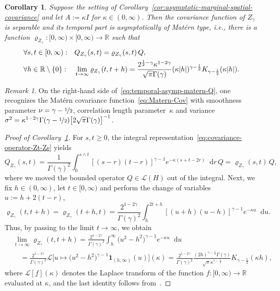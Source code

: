 \documentclass[reqno]{amsart}
\numberwithin{equation}{section}
\newcommand{\bbR}{\mathbb{R}}
\newcommand{\R}{\mathbb{R}}
\newcommand{\cL}{\mathcal{L}}
\newcommand{\rd}{\mathop{}\!\mathrm{d}}
\newcommand{\from}{\colon}
\newtheorem{corollary}[lemma]{Corollary}
\theoremstyle{remark}
\newtheorem{remark}[lemma]{Remark}
\theoremstyle{definition}
\begin{document}
\begin{corollary}\label{cor:separable-cov}
	Suppose the setting of 
	Corollary~\textup{\ref{cor:asymptotic-marginal-spatial-covariance}} and 
	let $A := \kappa I$ for ${\kappa \in (0,\infty)}$. 
	Then the covariance function of $Z_\gamma$ is 
	separable and its temporal part 
	is asymptotically of Matérn type, 
	i.e., there is a function 
	$\varrho_{Z_\gamma}\colon [0,\infty)\times[0,\infty) \to \R$ 
	such that  
	\begin{align}
	&\forall s,t \in [0,\infty):
	&&
	Q_{Z_\gamma}(s,t) 
	=
	\varrho_{Z_\gamma}(s,t)\, Q , 
	\notag
	\\ 
	&\forall h \in \bbR\setminus\{0\}: 
	&&
	\lim_{t\to\infty}\varrho_{Z_\gamma}(t,t+h)
	= 
	\frac{2^{\frac{1}{2}-\gamma}\kappa^{1-2\gamma}}
	{\sqrt{\pi}\Gamma(\gamma)}
	(\kappa |h|)^{\gamma-\frac{1}{2}} 
	K_{\gamma-\frac{1}{2}}(\kappa |h|) . 
	\label{eq:temporal-asymp-matern-Q}  
	\end{align}
\end{corollary}

\begin{remark}
	On the right-hand side 
	of~\eqref{eq:temporal-asymp-matern-Q}, one recognizes the
	Mat\'ern covariance function~\eqref{eq:Matern-Cov} 
	with smoothness parameter $\nu = \gamma-\nicefrac{1}{2}$,
	correlation length parameter~$\kappa$ and variance
	$\sigma^2 
	= 
	\kappa^{1-2\gamma} \Gamma(\gamma-\nicefrac{1}{2}) 
	\bigl[ 2 \sqrt{\pi} \Gamma(\gamma) \bigr]^{-1}$\!. 
\end{remark} 

\begin{proof}[Proof of Corollary~\ref{cor:separable-cov}] 
	For $s,t \geq 0$,
	the integral representation~\eqref{eq:covariance-operator-Zt-Zs} 
	yields 
	\[ 
	Q_{Z_\gamma}(s,t) 
	= 
	\frac{1}{\Gamma(\gamma)^2}
	\int_0^{s\wedge t}
	[(s-r)(t-r)]^{\gamma-1} e^{-\kappa(s+t-2r)}
	\rd r
	\, Q 
	= \varrho_{Z_\gamma}(s,t) \, Q,
	\] 
	where we moved the bounded operator $Q\in \mathscr L(H)$ 
	out of the integral.	
	Next, we fix $h \in (0,\infty)$, let $t \in [0,\infty)$ 
	and perform the change of 
	variables ${u :=h + 2(t-r) }$, 
	\[ 
	\varrho_{Z_\gamma}(t,t+h)   
	=
	\varrho_{Z_\gamma}(t+h,t)  
	= 
	\frac{2^{1-2\gamma}}{\Gamma(\gamma)^2}
	\int_h^{2t+h}
	[(u+h)(u-h)]^{\gamma-1} e^{-\kappa u}
	\rd u. 
	\] 
	Thus, by passing to the limit $t \to \infty$, 
	we obtain  
	\begin{align*}
	&\lim_{t\to\infty} \varrho_{Z_\gamma}(t,t+h)
	= 
	\frac{2^{1-2\gamma}}{\Gamma(\gamma)^2}
	\int_h^{\infty}
	\bigl( u^2 - h^2 \bigr)^{\gamma-1} e^{-\kappa u}
	\rd u
	\\ 
	&\quad = 
	\frac{2^{1-2\gamma}}
	{\Gamma(\gamma)^2} 
	\cL
	\bigl[
	u
	\mapsto
	\bigl( u^2-h^2 \bigr)^{\gamma-1} 
	\mathbf 1_{(h,\infty)}(u)
	\bigr]
	(\kappa) 
	= 
	\frac{2^{1-2\gamma}}
	{\Gamma(\gamma)^2} 
	\frac{(2h)^{\gamma-\frac{1}{2}} 
		\Gamma(\gamma)}{\sqrt{\pi}\kappa^{\gamma-\frac{1}{2}}} 
	K_{\gamma-\frac{1}{2}}(\kappa h), 
	\end{align*}
	where $\cL[f](\kappa)$ denotes the Laplace transform of
	the function $f \from [0,\infty)\to\R$ evaluated at $\kappa$,
	and the last identity follows 
	from~\cite[Chapter I, Formula~3.13]{Oberhettinger1973}. 
\end{proof}
\end{document}
